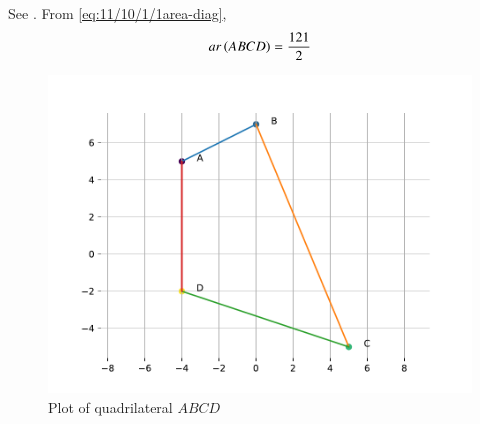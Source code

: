 See .
    From 
        \eqref{eq:11/10/1/1area-diag},
    \begin{align}
ar\left(ABCD\right)
	       = \frac{121}{2}
        \label{eq:11/10/1/1ans}
    \end{align}
    \begin{figure}[H]
        \centering
        \includegraphics[width=0.75\columnwidth]{chapters/11/10/1/1/figs/fig.pdf}
        \caption{Plot of quadrilateral $ABCD$}
        \label{fig:11/10/1/1quad}
    \end{figure}
